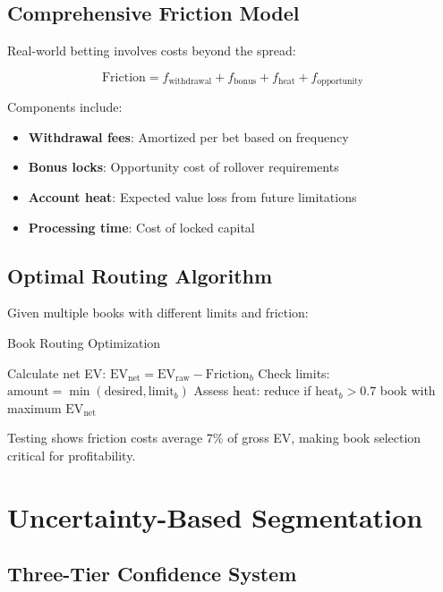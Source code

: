 \subsection{Comprehensive Friction Model}

Real-world betting involves costs beyond the spread:

\begin{equation}
\text{Friction} = f_{\text{withdrawal}} + f_{\text{bonus}} + f_{\text{heat}} + f_{\text{opportunity}}
\end{equation}

Components include:
\begin{itemize}
  \item \textbf{Withdrawal fees}: Amortized per bet based on frequency
  \item \textbf{Bonus locks}: Opportunity cost of rollover requirements
  \item \textbf{Account heat}: Expected value loss from future limitations
  \item \textbf{Processing time}: Cost of locked capital
\end{itemize}

\subsection{Optimal Routing Algorithm}

Given multiple books with different limits and friction:

\begin{algorithm}[h]
\caption{Book Routing Optimization}
\begin{algorithmic}[1]
  \State Calculate net EV: $\text{EV}_{\text{net}} = \text{EV}_{\text{raw}} - \text{Friction}_b$
  \State Check limits: $\text{amount} = \min(\text{desired}, \text{limit}_b)$
  \State Assess heat: reduce if $\text{heat}_b > 0.7$
\EndFor
\State \Return book with maximum $\text{EV}_{\text{net}}$
\end{algorithmic}
\end{algorithm}

Testing shows friction costs average 7\% of gross EV, making book selection critical for profitability.

\section{Uncertainty-Based Segmentation}

\subsection{Three-Tier Confidence System}

